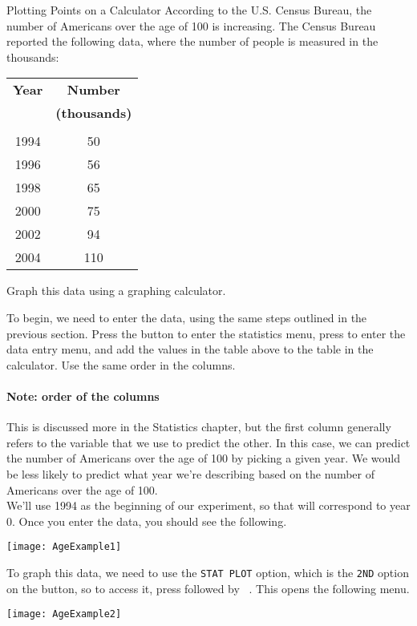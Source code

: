 \begin{example}[https://www.youtube.com/watch?v=N97Qj97Siec&list=PLfmpjsIzhztutjEb8Pg5OBOlI1p80yVoy&index=5]{Plotting Points on a Calculator}
According to the U.S. Census Bureau, the number of Americans over the age of 100 is increasing.  The Census Bureau reported the following data, where the number of people is measured in the thousands:
\begin{center}
\begin{tabular}{c c}
\textbf{Year} & \textbf{Number}\\
& \textbf{(thousands)}\\
\hline
& \\
1994 & 50\\
1996 & 56\\
1998 & 65\\
2000 & 75\\
2002 & 94\\
2004 & 110
\end{tabular}
\end{center}

Graph this data using a graphing calculator.

\sol
To begin, we need to enter the data, using the same steps outlined in the previous section.  Press the  button to enter the statistics menu, press  to enter the data entry menu, and add the values in the table above to the table in the calculator.  Use the same order in the columns.

\paragraph{Note: order of the columns} This is discussed more in the Statistics chapter, but the first column generally refers to the variable that we use to predict the other.  In this case, we can predict the number of Americans over the age of 100 by picking a given year.  We would be less likely to predict what year we're describing based on the number of Americans over the age of 100.\\

We'll use 1994 as the beginning of our experiment, so that will correspond to year 0.  Once you enter the data, you should see the following.
\begin{center}
\texttt{[image: AgeExample1]}
\end{center}

To graph this data, we need to use the \texttt{STAT PLOT} option, which is the \texttt{2ND} option on the  button, so to access it, press  followed by \ .  This opens the following menu.
\begin{center}
\texttt{[image: AgeExample2]}
\end{center}


\end{example}
